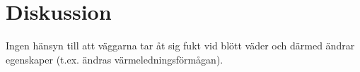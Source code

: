 \section{Diskussion}


Ingen hänsyn till att väggarna tar åt sig fukt vid blött väder och därmed ändrar egenskaper (t.ex. ändras värmeledningsförmågan).








